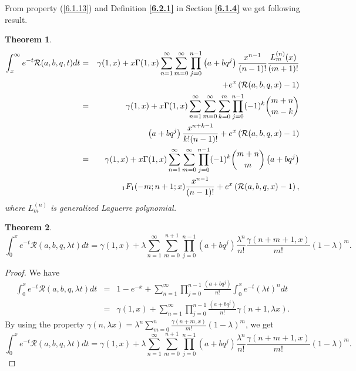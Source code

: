 \documentclass[12pt]{article}
\newtheorem{The}{Theorem}[section]
\numberwithin{equation}{section}
\begin{document}
From property (\ref{6.1.13}) and Definition  \textbf{\ref{6.2.1}} in Section \textbf{\ref{6.1.4}} we get following result.

\begin{The}
\begin{eqnarray}
\int_{x}^\infty e^{-t}\mathcal{R}(a,b,q,t)dt &=& \gamma (1, x) +x\Gamma (1, x)\sum_{n=1}^\infty \sum_{m=0}^\infty\prod_{j=0}^{n-1}\left(a+bq^j\right)\frac {x^{n-1}}{(n-1)!}\frac{L_{m}^{(n)}(x)}{(m+1)!} \nonumber \\
&&+ e^x\left(\mathcal{R}(a,b,q,x)-1\right)\\
&=& \gamma (1, x) + x \Gamma (1, x)\sum_{n=1}^\infty \sum_{m=0}^\infty \sum_{k=0}^m \prod_{j=0}^{n-1} (-1)^k \dbinom{m+n}{m-k}  \nonumber \\
&& \left(a+bq^j\right) \frac {x^{n+k-1}}{k!(n-1)!} + e^x\left(\mathcal{R}(a,b,q,x)-1\right)\\
&=& \gamma (1, x) + x \Gamma (1, x)\sum_{n=1}^\infty \sum_{m=0}^\infty  \prod_{j=0}^{n-1} (-1)^k \dbinom{m+n}{m}  \left(a+bq^j\right) \nonumber \\
&& {}_1F_{1}(-m; n+1; x) \frac {x^{n-1}}{(n-1)!} + e^x\left(\mathcal{R}(a,b,q,x)-1\right),
\end{eqnarray}
where $L_{m}^{(n)}$ is generalized Laguerre polynomial.
\end{The}


\begin{The}\label{6.5.4}
\begin{equation}
\int_{0}^x e^{-t}\mathcal{R}(a,b,q,\lambda t)dt = \gamma (1, x) + 
\lambda\sum_{n=1}^\infty \sum_{m=0}^{n+1} \prod_{j=0}^{n-1}\left(a+bq^j\right)\frac {\lambda^n}{n!} \frac {\gamma(n+m+1, x)}{m!}(1-\lambda)^m.
\end{equation}
\end{The}
\begin{proof} We have 
\begin{eqnarray}
\int_{0}^x e^{-t}\mathcal{R}(a,b,q,\lambda t)dt &=& 1 - e^{-x} +  
\sum_{n=1}^\infty  \prod_{j=0}^{n-1}\frac{\left(a+bq^j\right)}{n!}\int_{0}^x e^{-t}(\lambda t)^n dt\nonumber\\
&=& \gamma(1,x) + \sum_{n=1}^\infty  \prod_{j=0}^{n-1} \frac {\left(a+bq^j\right)}{n!} \gamma(n+1,\lambda x). 
\end{eqnarray}
By using the property \cite{Gautschi}
 $\gamma(n,\lambda x) = \lambda^n\sum_{m=0}^n\frac{\gamma(n+m, x)}{m!}(1-\lambda)^m$, we get 
\begin{equation*}
\int_{0}^x e^{-t}\mathcal{R}(a,b,q,\lambda t)dt = \gamma (1, x) + 
\lambda\sum_{n=1}^\infty \sum_{m=0}^{n+1} \prod_{j=0}^{n-1}\left(a+bq^j\right)\frac {\lambda^n}{n!} \frac {\gamma(n+m+1, x)}{m!}(1-\lambda)^m.
\end{equation*}
\end{proof}
\end{document}
